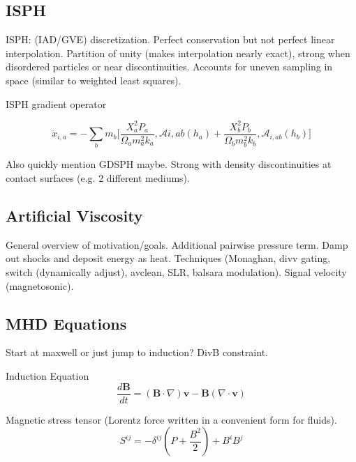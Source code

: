 \subsection{ISPH}

ISPH: (IAD/GVE) discretization. Perfect conservation but not perfect linear interpolation. Partition of unity (makes interpolation nearly exact), strong when disordered particles or near discontinuities. Accounts for uneven sampling in space (similar to weighted least squares). 

ISPH gradient operator

\begin{equation}
\ddot{x}_{i,a} = -\sum_b m_b\Big[\frac{X_a^2 P_a}{\Omega_a m_a^2 k_a},\mathcal{A}{i,ab}(h_a) + \frac{X_b^2 P_b}{\Omega_b m_b^2 k_b},\mathcal{A}_{i,ab}(h_b)\Big]
\end{equation}

Also quickly mention GDSPH maybe. Strong with density discontinuities at contact surfaces (e.g. 2 different mediums). 

\subsection{Artificial Viscosity}
General overview of motivation/goals. Additional pairwise pressure term. Damp out shocks and deposit energy as heat. Techniques (Monaghan, divv gating, switch (dynamically adjust), avclean, SLR, balsara modulation). Signal velocity (magnetosonic). 

\subsection{MHD Equations}

Start at maxwell or just jump to induction? DivB constraint. 

Induction Equation
\begin{equation}
    \frac{d\mathbf{B}}{dt} = (\mathbf{B}\cdot\nabla)\mathbf{v} - \mathbf{B}(\nabla\cdot\mathbf{v})
\end{equation}

Magnetic stress tensor (Lorentz force written in a convenient form for fluids). 
\begin{equation}
S^{ij} = -\delta^{ij}\left(P + \frac{B^2}{2}\right) + B^i B^j  
\end{equation}

